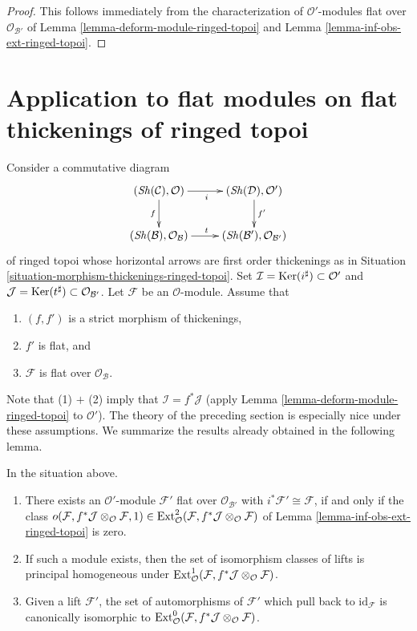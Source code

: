 \begin{proof}
This follows immediately from the characterization of
$\mathcal{O}'$-modules flat over $\mathcal{O}_{\mathcal{B}'}$ of 
Lemma \ref{lemma-deform-module-ringed-topoi} and
Lemma \ref{lemma-inf-obs-ext-ringed-topoi}.
\end{proof}






\section{Application to flat modules on flat thickenings of ringed topoi}
\label{section-flat-ringed-topoi}

\noindent
Consider a commutative diagram
$$
\xymatrix{
(\Sh(\mathcal{C}), \mathcal{O}) \ar[r]_i \ar[d]_f &
(\Sh(\mathcal{D}), \mathcal{O}') \ar[d]^{f'} \\
(\Sh(\mathcal{B}), \mathcal{O}_\mathcal{B}) \ar[r]^t &
(\Sh(\mathcal{B}'), \mathcal{O}_{\mathcal{B}'})
}
$$
of ringed topoi whose horizontal arrows are first order thickenings
as in Situation \ref{situation-morphism-thickenings-ringed-topoi}. Set
$\mathcal{I} = \mathop{\mathrm{Ker}}(i^\sharp) \subset \mathcal{O}'$ and
$\mathcal{J} = \mathop{\mathrm{Ker}}(t^\sharp) \subset \mathcal{O}_{\mathcal{B}'}$.
Let $\mathcal{F}$ be an $\mathcal{O}$-module. Assume that
\begin{enumerate}
\item $(f, f')$ is a strict morphism of thickenings,
\item $f'$ is flat, and
\item $\mathcal{F}$ is flat over $\mathcal{O}_\mathcal{B}$.
\end{enumerate}
Note that (1) $+$ (2) imply that $\mathcal{I} = f^*\mathcal{J}$
(apply Lemma \ref{lemma-deform-module-ringed-topoi} to $\mathcal{O}'$).
The theory of the preceding section is especially nice
under these assumptions. We summarize the results already obtained
in the following lemma.

\begin{lemma}
\label{lemma-flat-ringed-topoi}
In the situation above.
\begin{enumerate}
\item There exists an $\mathcal{O}'$-module $\mathcal{F}'$ flat over
$\mathcal{O}_{\mathcal{B}'}$ with $i^*\mathcal{F}' \cong \mathcal{F}$,
if and only if
the class $o(\mathcal{F}, f^*\mathcal{J} \otimes_\mathcal{O} \mathcal{F}, 1)
\in \mathop{\mathrm{Ext}}\nolimits^2_\mathcal{O}(
\mathcal{F}, f^*\mathcal{J} \otimes_\mathcal{O} \mathcal{F})$
of Lemma \ref{lemma-inf-obs-ext-ringed-topoi} is zero.
\item If such a module exists, then the set of isomorphism classes
of lifts is principal homogeneous under
$\mathop{\mathrm{Ext}}\nolimits^1_\mathcal{O}(
\mathcal{F}, f^*\mathcal{J} \otimes_\mathcal{O} \mathcal{F})$.
\item Given a lift $\mathcal{F}'$, the set of automorphisms of
$\mathcal{F}'$ which pull back to $\text{id}_\mathcal{F}$ is canonically
isomorphic to $\mathop{\mathrm{Ext}}\nolimits^0_\mathcal{O}(
\mathcal{F}, f^*\mathcal{J} \otimes_\mathcal{O} \mathcal{F})$.
\end{enumerate}
\end{lemma}

